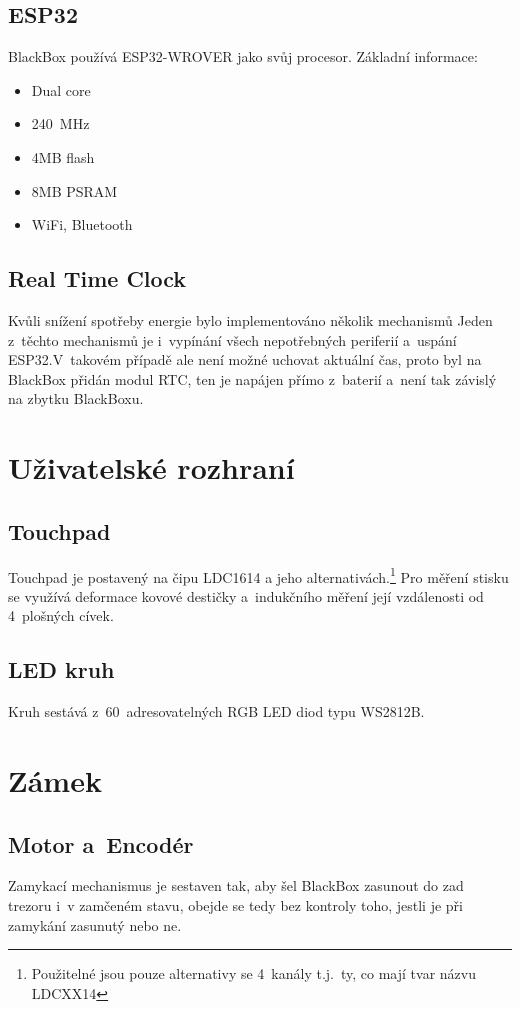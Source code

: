 \subsection{ESP32}
BlackBox používá ESP32-WROVER jako svůj procesor.
Základní informace:
\begin{itemize}
    \item Dual core
    \item 240~MHz
    \item 4MB flash
    \item 8MB PSRAM
    \item WiFi, Bluetooth
\end{itemize}

\subsection{Real Time Clock}
Kvůli snížení spotřeby energie bylo implementováno několik mechanismů
Jeden z~těchto mechanismů je i~vypínání všech nepotřebných periferií a~uspání ESP32.V~takovém případě ale není možné uchovat aktuální čas, proto byl na BlackBox přidán modul RTC, ten je napájen přímo z~baterií a~není tak závislý na zbytku BlackBoxu.

\section{Uživatelské rozhraní}

\subsection{Touchpad}
Touchpad je postavený na čipu LDC1614 a jeho alternativách.\footnote{Použitelné jsou pouze alternativy se 4~kanály t.j.~ty, co mají tvar názvu LDCXX14}
Pro měření stisku se využívá deformace kovové destičky a~indukčního měření její vzdálenosti od 4~plošných cívek.

\subsection{LED kruh}
Kruh sestává z~60~adresovatelných RGB LED diod typu WS2812B.

\section{Zámek}

\subsection{Motor a~Encodér}
Zamykací mechanismus je sestaven tak, aby šel BlackBox zasunout do zad trezoru i~v zamčeném stavu, obejde se tedy bez kontroly toho, jestli je při zamykání zasunutý nebo ne.

